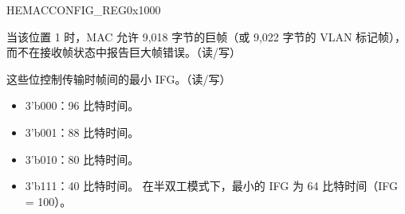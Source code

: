 \begin{register}{H}{EMACCONFIG\_REG}{0x1000}
\begin{regdesc}
\begin{reglist}
\item [EMACJUMBOFRAME]当该位置 1 时，MAC 允许 9,018 字节的巨帧（或 9,022 字节的 VLAN 标记帧），而不在接收帧状态中报告巨大帧错误。（读/写）
\item [EMACINTERFRAMEGAP]这些位控制传输时帧间的最小 IFG。（读/写）
\begin{itemize}
\item 3'b000：96 比特时间。\item 3'b001：88 比特时间。\item 3'b010：80 比特时间。\item 3'b111：40 比特时间。
在半双工模式下，最小的 IFG 为 64 比特时间（IFG = 100）。\end{itemize}
\item[寄存器描述下一页继续。]
\end{reglist}\end{regdesc}
\end{register}
\addtocounter{Regfloat}{-1}
